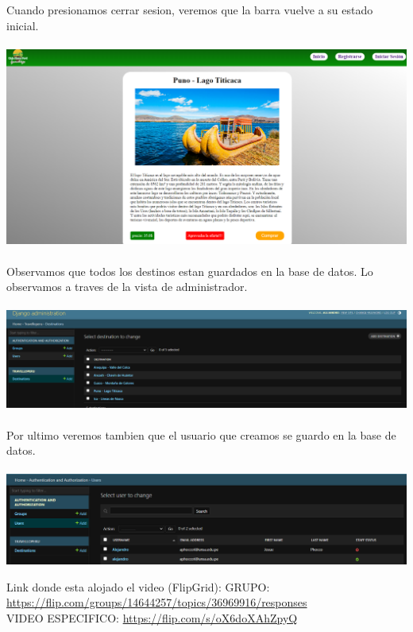 \documentclass{article}
\begin{document}
            Cuando presionamos cerrar sesion, veremos que la barra vuelve a su estado inicial.
            \\ \\
            \includegraphics[width=16cm]{img/LOGOUT.png}
            \\ \\
            Observamos que todos los destinos estan guardados en la base de datos. Lo observamos a traves de la vista de administrador.
            \\ \\
            \includegraphics[width=16cm]{img/DESTINOSADMIN.png}
            \\ \\
            Por ultimo veremos tambien que el usuario que creamos se guardo en la base de datos.
            \\ \\
            \includegraphics[width=16cm]{img/USERADMIN.png}
            
            
            
            Link donde esta alojado el video (FlipGrid):\newline
            GRUPO: \url{https://flip.com/groups/14644257/topics/36969916/responses} \\
            VIDEO ESPECIFICO: \url{https://flip.com/s/oX6doXAhZpyQ}
        
\end{document}
